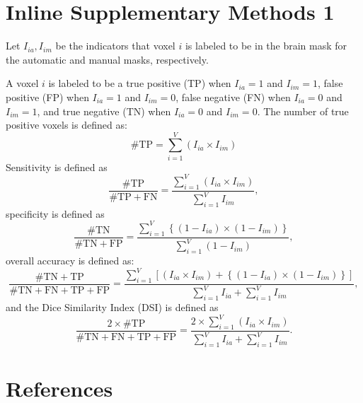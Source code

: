 \documentclass{elsarticle}\usepackage[]{graphicx}\usepackage[]{color}
\begin{document}
\section*{Inline Supplementary Methods 1}
Let $I_{ia}, I_{im}$ be the indicators that voxel $i$ is labeled to be in the brain mask for the automatic and manual masks, respectively.  

A voxel $i$ is labeled to be a true positive (TP) when $I_{ia} = 1$ and $I_{im} = 1$, false positive (FP) when $I_{ia} = 1$ and $I_{im} = 0$, false negative (FN) when $I_{ia} = 0$ and $I_{im} = 1$, and true negative (TN) when $I_{ia} = 0$ and $I_{im} = 0$.  The number of true positive voxels is defined as: 
$$
\# \text{TP} = \sum_{i=1}^{V} \left( I_{ia} \times I_{im}\right)
$$
Sensitivity is defined as
$$
\frac{\# \text{TP} }{\# \text{TP} + \text{FN}} = \frac{ \sum_{i=1}^{V} \left( I_{ia} \times I_{im}\right) }{ \sum_{i=1}^{V} I_{im}},
$$
specificity is defined as
$$
\frac{\# \text{TN} }{\# \text{TN} + \text{FP}} = \frac{ \sum_{i=1}^{V} \left\{ (1-I_{ia}) \times (1- I_{im} ) \right\} }{ \sum_{i=1}^{V} (1 - I_{im} )},
$$
overall accuracy is defined as:
$$
\frac{\# \text{TN} + \text{TP} }{\# \text{TN} + \text{FN} + \text{TP} + \text{FP}} = \frac{ \sum_{i=1}^{V} \left[ (I_{ia} \times I_{im}) + \left\{ (1-I_{ia}) \times (1- I_{im} ) \right\} \right] }{\sum_{i=1}^{V} I_{ia}  + \sum_{i=1}^{V} I_{im}},
$$
and the Dice Similarity Index (DSI) is defined as
$$
\frac{2 \times \#\text{TP} }{ \# \text{TN} + \text{FN} + \text{TP} + \text{FP}} = \frac{ 2 \times \sum_{i=1}^{V} \left( I_{ia} \times I_{im}\right) }{\sum_{i=1}^{V} I_{ia}  + \sum_{i=1}^{V} I_{im}}.
$$


\newpage
\section*{References}


\end{document}
